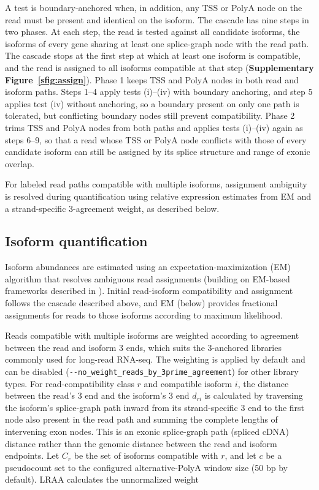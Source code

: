 A test is boundary-anchored when, in addition, any TSS or PolyA node on the read must be present and identical on the isoform. The cascade has nine steps in two phases. At each step, the read is tested against all candidate isoforms, the isoforms of every gene sharing at least one splice-graph node with the read path. The cascade stops at the first step at which at least one isoform is compatible, and the read is assigned to all isoforms compatible at that step (\textbf{Supplementary Figure~\ref{sfig:assign}}). Phase 1 keeps TSS and PolyA nodes in both read and isoform paths. Steps 1--4 apply tests (i)--(iv) with boundary anchoring, and step 5 applies test (iv) without anchoring, so a boundary present on only one path is tolerated, but conflicting boundary nodes still prevent compatibility. Phase 2 trims TSS and PolyA nodes from both paths and applies tests (i)--(iv) again as steps 6--9, so that a read whose TSS or PolyA node conflicts with those of every candidate isoform can still be assigned by its splice structure and range of exonic overlap.

For labeled read paths compatible with multiple isoforms, assignment ambiguity is resolved during quantification using relative expression estimates from EM and a strand-specific 3\p{}-agreement weight, as described below.

\subsection{Isoform quantification}\label{isoform-quantification}

Isoform abundances are estimated using an expectation-maximization (EM) algorithm that resolves ambiguous read assignments (building on EM-based frameworks described in \citealp{li2011, bray2016, patro2017, kabza2024, zarejousheghani2025, xing2006}). Initial read-isoform compatibility and assignment follows the cascade described above, and EM (below) provides fractional assignments for reads to those isoforms according to maximum likelihood. 

Reads compatible with multiple isoforms are weighted according to agreement between the read and isoform 3\p{} ends, which suits the 3\p{}-anchored libraries commonly used for long-read RNA-seq. The weighting is applied by default and can be disabled (\texttt{-{}-no\_weight\_reads\_by\_3prime\_agreement}) for other library types. For read-compatibility class \(r\) and compatible isoform \(i\), the distance between the read's 3\p{} end and the isoform's 3\p{} end \(d_{ri}\) is calculated by traversing the isoform's splice-graph path inward from its strand-specific 3\p{} end to the first node also present in the read path and summing the complete lengths of intervening exon nodes. This is an exonic splice-graph path (spliced cDNA) distance rather than the genomic distance between the read and isoform endpoints. Let \(C_r\) be the set of isoforms compatible with \(r\), and let \(c\) be a pseudocount set to the configured alternative-PolyA window size (50 bp by default). LRAA calculates the unnormalized weight

